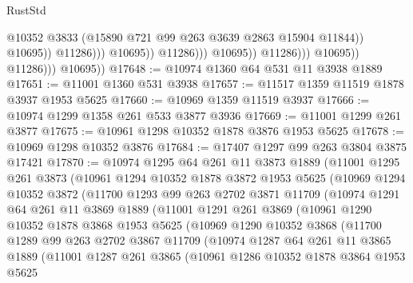 \begin{lexlean}{RustStd}
\begin{coremodule}
                                                  @10352
                                                  @3833
                                                  (@15890 @721 @99 @263 @3639 @2863 @15904 @11844))
                                                @10695))
                                            @11286)))
                                      @10695))
                                  @11286)))
                            @10695))
                        @11286)))
                  @10695))
              @11286)))
        @10695))
@17648 := @10974 @1360 @64 @531 @11 @3938 @1889
@17651 := @11001 @1360 @531 @3938
@17657 := @11517 @1359 @11519 @1878 @3937 @1953 @5625
@17660 := @10969 @1359 @11519 @3937
@17666 := @10974 @1299 @1358 @261 @533 @3877 @3936
@17669 := @11001 @1299 @261 @3877
@17675 := @10961 @1298 @10352 @1878 @3876 @1953 @5625
@17678 := @10969 @1298 @10352 @3876
@17684 := @17407 @1297 @99 @263 @3804 @3875 @17421
@17870 := @10974
    @1295
    @64
    @261
    @11
    @3873
    @1889
    (@11001
      @1295
      @261
      @3873
      (@10961
        @1294
        @10352
        @1878
        @3872
        @1953
        @5625
        (@10969
          @1294
          @10352
          @3872
          (@11700
            @1293
            @99
            @263
            @2702
            @3871
            @11709
            (@10974
              @1291
              @64
              @261
              @11
              @3869
              @1889
              (@11001
                @1291
                @261
                @3869
                (@10961
                  @1290
                  @10352
                  @1878
                  @3868
                  @1953
                  @5625
                  (@10969
                    @1290
                    @10352
                    @3868
                    (@11700
                      @1289
                      @99
                      @263
                      @2702
                      @3867
                      @11709
                      (@10974
                        @1287
                        @64
                        @261
                        @11
                        @3865
                        @1889
                        (@11001
                          @1287
                          @261
                          @3865
                          (@10961
                            @1286
                            @10352
                            @1878
                            @3864
                            @1953
                            @5625

\end{coremodule}
\end{lexlean}
